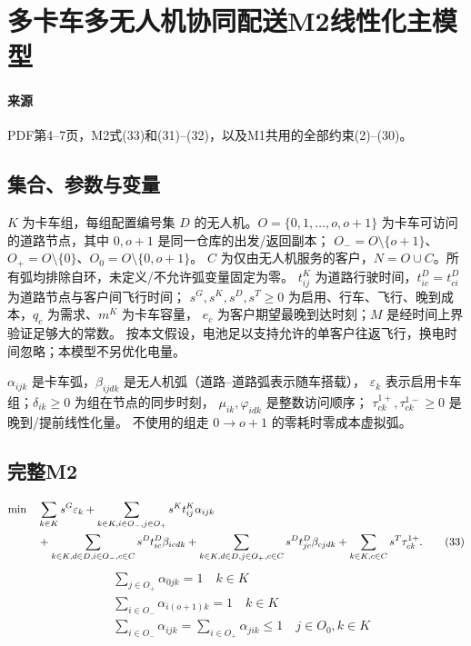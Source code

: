 \documentclass[UTF8,11pt]{ctexart}
\begin{document}
\section*{多卡车多无人机协同配送M2线性化主模型}

\paragraph{来源} PDF第4--7页，M2式(33)和(31)--(32)，以及M1共用的全部约束(2)--(30)。
\subsection*{集合、参数与变量}
$K$ 为卡车组，每组配置编号集 $D$ 的无人机。$O=\{0,1,\ldots,o,o+1\}$
为卡车可访问的道路节点，其中 $0,o+1$ 是同一仓库的出发/返回副本；
$O_-=O\setminus\{o+1\}$、$O_+=O\setminus\{0\}$、$O_0=O\setminus\{0,o+1\}$。
$C$ 为仅由无人机服务的客户，$N=O\cup C$。所有弧均排除自环，未定义/不允许弧变量固定为零。
$t^K_{ij}$ 为道路行驶时间，$t^D_{ic}=t^D_{ci}$ 为道路节点与客户间飞行时间；
$s^G,s^K,s^D,s^T\ge0$ 为启用、行车、飞行、晚到成本，$q_c$ 为需求、$m^K$ 为卡车容量，
$e_c$ 为客户期望最晚到达时刻；$M$ 是经时间上界验证足够大的常数。
按本文假设，电池足以支持允许的单客户往返飞行，换电时间忽略；本模型不另优化电量。

$\alpha_{ijk}$ 是卡车弧，$\beta_{ijdk}$ 是无人机弧（道路--道路弧表示随车搭载），
$\varepsilon_k$ 表示启用卡车组；$\delta_{ik}\ge0$ 为组在节点的同步时刻，
$\mu_{ik},\varphi_{idk}$ 是整数访问顺序；
$\tau_{ck}^{1+},\tau_{ck}^{1-}\ge0$ 是晚到/提前线性化量。
不使用的组走 $0\to o+1$ 的零耗时零成本虚拟弧。
\subsection*{完整M2}

\begin{align}
\min\quad&\sum_{k\in K}s^G\varepsilon_k+
\sum_{k\in K,i\in O_-,j\in O_+}s^Kt^K_{ij}\alpha_{ijk}\notag\\
&+\sum_{k\in K,d\in D,i\in O_-,c\in C}s^Dt^D_{ic}\beta_{icdk}
+\sum_{k\in K,d\in D,j\in O_+,c\in C}s^Dt^D_{jc}\beta_{cjdk}
+\sum_{k\in K,c\in C}s^T\tau_{ck}^{1+}.\tag{33}
\end{align}
\begin{align}
& \sum_{j \in O_+} \alpha_{0jk} = 1 \quad k \in K \\
& \sum_{i \in O_-} \alpha_{i(o+1)k} = 1 \quad k \in K \\
& \sum_{i \in O_-} \alpha_{ijk} = \sum_{i \in O_+} \alpha_{jik} \le 1 \quad j \in O_0, k \in K
\end{align}
\end{document}
